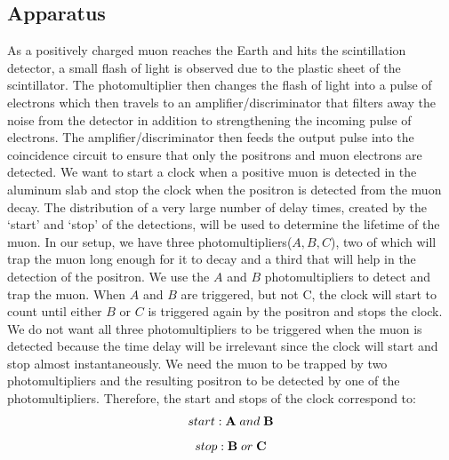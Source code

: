 \subsection{Apparatus}
\indent  \indent As a positively charged muon reaches the Earth and hits the scintillation detector, a small flash of light is observed due to the plastic sheet of the scintillator. The photomultiplier then changes the flash of light into a pulse of electrons which then travels to an amplifier/discriminator that filters away the noise from the detector in addition to strengthening the incoming pulse of electrons. The amplifier/discriminator then feeds the output pulse into the coincidence circuit to ensure that only the positrons and muon electrons are detected. 
\newline \indent We want to start a clock when a positive muon is detected in the aluminum slab and stop the clock when the positron is detected from the muon decay. The distribution of a very large number of delay times, created by the `start' and `stop' of the detections, will be used to determine the lifetime of the muon. 
\newline \indent In our setup, we have three photomultipliers($A, B, C$), two of which will trap the muon long enough for it to decay and a third that will help in the detection of the positron. We use the $A$ and $B$ photomultipliers to detect and trap the muon. When $A$ and $B$ are triggered, but not C, the clock will start to count until either $B$ or $C$ is triggered again by the positron and stops the clock. We do not want all three photomultipliers to be triggered when the muon is detected because the time delay will be irrelevant since the clock will start and stop almost instantaneously. We need the muon to be trapped by two photomultipliers and the resulting positron to be detected by one of the photomultipliers. Therefore, the start and stops of the clock correspond to:
\begin{equation} start: \textbf A\;and\; \textbf B \end{equation}
\begin{equation} stop: \textbf B\; or\; \textbf C \end{equation}
